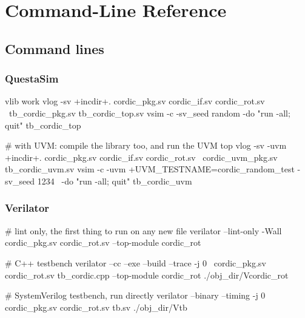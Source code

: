 \chapter{Command-Line Reference}
\label{app:simcommands}


\section{Command lines}

\subsection*{QuestaSim}

\begin{shcode}
vlib work
vlog -sv +incdir+. cordic_pkg.sv cordic_if.sv cordic_rot.sv \
        tb_cordic_pkg.sv tb_cordic_top.sv
vsim -c -sv_seed random -do "run -all; quit" tb_cordic_top

# with UVM: compile the library too, and run the UVM top
vlog -sv -uvm +incdir+. cordic_pkg.sv cordic_if.sv cordic_rot.sv \
        cordic_uvm_pkg.sv tb_cordic_uvm.sv
vsim -c -uvm +UVM_TESTNAME=cordic_random_test -sv_seed 1234 \
        -do "run -all; quit" tb_cordic_uvm
\end{shcode}

\subsection*{Verilator}

\begin{shcode}
# lint only, the first thing to run on any new file
verilator --lint-only -Wall cordic_pkg.sv cordic_rot.sv --top-module cordic_rot

# C++ testbench
verilator --cc --exe --build --trace -j 0 \
          cordic_pkg.sv cordic_rot.sv tb_cordic.cpp --top-module cordic_rot
./obj_dir/Vcordic_rot

# SystemVerilog testbench, run directly
verilator --binary --timing -j 0 cordic_pkg.sv cordic_rot.sv tb.sv
./obj_dir/Vtb
\end{shcode}

